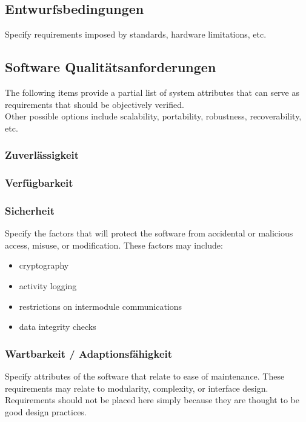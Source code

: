 \subsection{Entwurfsbedingungen}
Specify requirements imposed by standards, hardware limitations, etc.

\subsection{Software Qualitätsanforderungen}
The following items provide a partial list of system attributes that can serve as requirements that should be objectively verified. \\[0.1cm]
Other possible options include scalability, portability, robustness, recoverability, etc.

\subsubsection{Zuverlässigkeit}

\subsubsection{Verfügbarkeit}

\subsubsection{Sicherheit}
Specify the factors that will protect the software from accidental or malicious access, misuse, or modification. These factors may include:
\begin{itemize}
	\item cryptography
	\item activity logging
	\item restrictions on intermodule communications
	\item data integrity checks
\end{itemize}

\subsubsection{Wartbarkeit / Adaptionsfähigkeit}
Specify attributes of the software that relate to ease of maintenance. These requirements may relate to modularity, complexity, or interface design. Requirements should not be placed here simply because they are thought to be good design practices.


